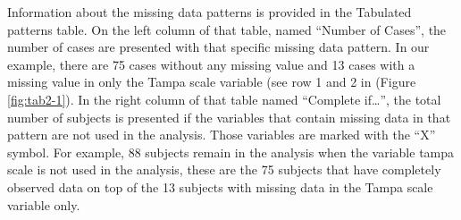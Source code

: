 \documentclass[]{book}
\begin{document}
Information about the missing data patterns is provided in the Tabulated
patterns table. On the left column of that table, named ``Number of
Cases'', the number of cases are presented with that specific missing
data pattern. In our example, there are 75 cases without any missing
value and 13 cases with a missing value in only the Tampa scale variable
(see row 1 and 2 in (Figure \ref{fig:tab2-1}). In the right column of
that table named ``Complete if\ldots{}'', the total number of subjects
is presented if the variables that contain missing data in that pattern
are not used in the analysis. Those variables are marked with the ``X''
symbol. For example, 88 subjects remain in the analysis when the
variable tampa scale is not used in the analysis, these are the 75
subjects that have completely observed data on top of the 13 subjects
with missing data in the Tampa scale variable only.
\end{document}
